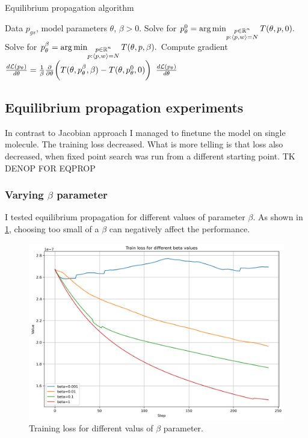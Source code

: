 \documentclass[a4paper,10.5pt]{report}
\begin{document}
\begin{algorithm}[H]
\caption{Equilibrium propagation algorithm}
\begin{algorithmic}[1]
\Require Data $p_{gs}$, model parameters $\theta$, $\beta>0$.
\State  Solve for $p_\theta^0  = \operatorname*{arg\,min}_{\substack{p \in \mathbb{R}^n \\ p: \langle p, w \rangle=N }} T(\theta, p, 0).$
\State Solve for $p_\theta^\beta  = \operatorname*{arg\,min}_{\substack{p \in \mathbb{R}^n \\ p: \langle p, w \rangle=N }} T(\theta, p, \beta).$
\State Compute gradient $\frac{d\mathcal{L}(p_\theta)}{d \theta} = \frac{1}{\beta} \frac{\partial }{\partial \theta} \bigg(T(\theta, p_\theta^\beta,\beta) - T(\theta, p_\theta^0, 0)\bigg)$
\State \Return $\frac{d\mathcal{L}(p_\theta)}{d \theta}$
\end{algorithmic}
\end{algorithm}


\subsection{Equilibrium propagation experiments}
In contrast to Jacobian approach I managed to finetune the model on single molecule.
The training loss decreased. What is more telling is that loss also decreased, when fixed point search was run from a different starting point.
TK DENOP FOR EQPROP
\subsubsection{Varying $\beta$ parameter}
I tested equilibrium propagation for different values of parameter $\beta$.
As shown in \ref{fig:betas}, choosing too small of a $\beta$ can negatively affect the performance.
\begin{figure}[H]
 \centering
 \includegraphics[scale=0.5]{images/train_loss_betas.png}
 \caption{Training loss for different valus of $\beta$ parameter.}
 \label{fig:betas}
\end{figure}
\end{document}
